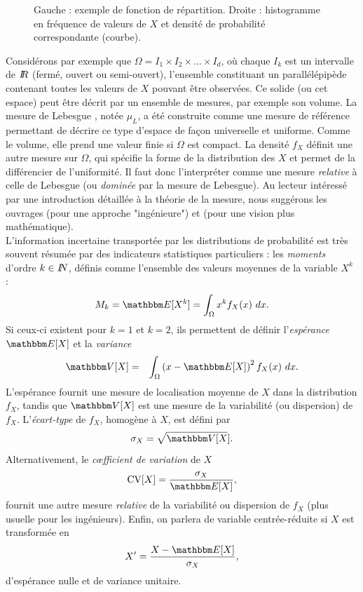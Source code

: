 \begin{figure}[h!]
\begin{minipage}[c]{.46\linewidth}
			\end{minipage}
	\caption{
      \label{chapitre1-fig1}
   Gauche : exemple de fonction de r\'epartition. Droite : histogramme en fr\'equence de valeurs de $X$ et densit\'e de probabilit\'e correspondante (courbe).}
\end{figure}

Consid\'erons par exemple que $\Omega=I_1\times I_2\times \ldots \times I_d$, o\`u chaque $I_k$ est un intervalle de $I\!\!R$ (ferm\'e, ouvert ou semi-ouvert), l'ensemble constituant un parall\'el\'epip\`ede contenant toutes les valeurs de $X$ pouvant \^etre observ\'ees. Ce solide (ou cet espace) peut \^etre d\'ecrit par un ensemble de mesures, par exemple son volume. La mesure de Lebesgue \cite{lebesgue1972}, not\'ee $\mu_L$,   a \'et\'e construite comme une mesure de r\'ef\'erence permettant de d\'ecrire ce type d'espace de fa\c con universelle et uniforme. Comme le volume, elle prend une valeur finie si $\Omega$ est compact. La densit\'e $f_X$ d\'efinit une autre mesure sur $\Omega$, qui sp\'ecifie la forme de la distribution des $X$ et permet de la diff\'erencier de l'uniformit\'e. Il faut donc l'interpr\'eter comme une mesure {\it relative} \`a celle de Lebesgue (ou {\it domin\'ee} par la mesure de Lebesgue). Au  lecteur int\'eress\'e par une introduction d\'etaill\'ee \`a la th\'eorie de la mesure, nous sugg\'erons les ouvrages \cite{Bouleau1986} (pour une approche "ing\'enieure") et \cite{LeGall2006} (pour une vision plus math\'ematique). \\

L'information incertaine transport\'ee par les distributions de probabilit\'e est tr\`es souvent r\'esum\'ee par des indicateurs statistiques particuliers : les {\it moments} d'ordre $k\in I\!\!N$, d\'efinis comme l'ensemble des valeurs moyennes de la variable $X^k$ : 
$$
M_k = \E[X^k] = \int_{\Omega} x^k f_X(x) \ dx.
$$
Si ceux-ci existent pour $k=1$ et $k=2$, ils permettent de d\'efinir l'{\it esp\'erance} $\E[X]$  et la {\it variance} 
\begin{eqnarray*}
\V[X] & = & \int_{\Omega} \left(x-\E[X]\right)^2 f_X(x) \ dx.
\end{eqnarray*}
L'esp\'erance fournit une mesure de localisation moyenne de $X$ dans la distribution $f_X$, tandis que $\V[X]$ est une mesure de la variabilit\'e (ou dispersion) de $f_X$. L'{\it \'ecart-type} de $f_X$, homog\`ene \`a $X$, est d\'efini par 
$$
\sigma_X=\sqrt{\V[X}].
$$ 
Alternativement, le {\it c{\oe}fficient de variation} de $X$ 
$$
\CV[X] = \frac{\sigma_X}{\E[X]},
$$
fournit une autre mesure {\it relative} de la variabilit\'e ou dispersion de $f_X$ (plus usuelle pour les ing\'enieurs). Enfin, on parlera de variable centr\'ee-r\'eduite si $X$ est transform\'ee en 
$$
X' = \frac{X-\E[X]}{\sigma_X},
$$
d'esp\'erance nulle et de variance unitaire. 

